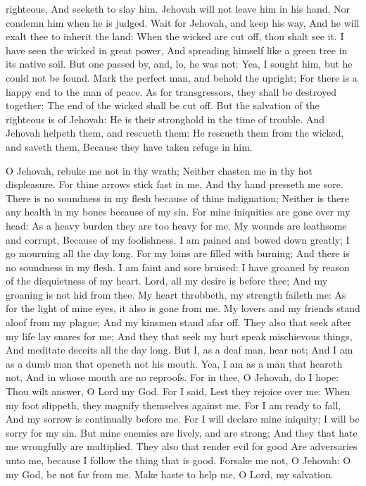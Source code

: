righteous, And seeketh to slay him.  Jehovah will not leave him in his hand, Nor condemn him when he is judged.  Wait for Jehovah, and keep his way, And he will exalt thee to inherit the land: When the wicked are cut off, thou shalt see it.  I have seen the wicked in great power, And spreading himself like a green tree in its native soil.  But one passed by, and, lo, he was not: Yea, I sought him, but he could not be found.  Mark the perfect man, and behold the upright; For there is a happy end to the man of peace.  As for transgressors, they shall be destroyed together: The end of the wicked shall be cut off.  But the salvation of the righteous is of Jehovah: He is their stronghold in the time of trouble.  And Jehovah helpeth them, and rescueth them: He rescueth them from the wicked, and saveth them, Because they have taken refuge in him. 

O Jehovah, rebuke me not in thy wrath; Neither chasten me in thy hot displeasure.  For thine arrows stick fast in me, And thy hand presseth me sore.  There is no soundness in my flesh because of thine indignation; Neither is there any health in my bones because of my sin.  For mine iniquities are gone over my head: As a heavy burden they are too heavy for me.  My wounds are loathsome and corrupt, Because of my foolishness.  I am pained and bowed down greatly; I go mourning all the day long.  For my loins are filled with burning; And there is no soundness in my flesh.  I am faint and sore bruised: I have groaned by reason of the disquietness of my heart.  Lord, all my desire is before thee; And my groaning is not hid from thee.  My heart throbbeth, my strength faileth me: As for the light of mine eyes, it also is gone from me.  My lovers and my friends stand aloof from my plague; And my kinsmen stand afar off.  They also that seek after my life lay snares for me; And they that seek my hurt speak mischievous things, And meditate deceits all the day long.  But I, as a deaf man, hear not; And I am as a dumb man that openeth not his mouth.  Yea, I am as a man that heareth not, And in whose mouth are no reproofs.  For in thee, O Jehovah, do I hope: Thou wilt answer, O Lord my God.  For I said, Lest they rejoice over me: When my foot slippeth, they magnify themselves against me.  For I am ready to fall, And my sorrow is continually before me.  For I will declare mine iniquity; I will be sorry for my sin.  But mine enemies are lively, and are strong; And they that hate me wrongfully are multiplied.  They also that render evil for good Are adversaries unto me, because I follow the thing that is good.  Forsake me not, O Jehovah: O my God, be not far from me.  Make haste to help me, O Lord, my salvation. 

